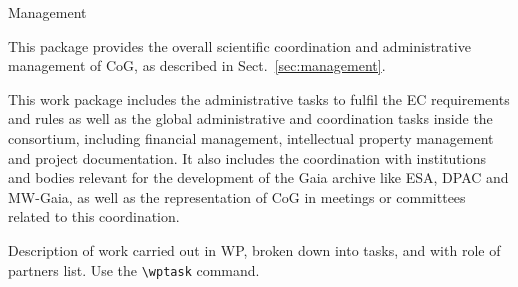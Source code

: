 
\begin{workpackage}{Management}
  \label{wp:management} %



  \makewptable %

  \begin{wpobjectives}
    This package provides the overall scientific coordination and administrative management of CoG, as described in Sect.~\ref{sec:management}.
  \end{wpobjectives}

  \begin{wpdescription}

    This work package includes the administrative tasks to fulfil the EC requirements and rules as
    well as the global administrative and coordination tasks inside the consortium, including financial
    management, intellectual property management and project documentation. It also includes the
    coordination with institutions and bodies relevant for the development of the Gaia archive like
    ESA, DPAC and MW-Gaia, as well as the representation of CoG in meetings or committees
    related to this coordination.
    
    Description of work carried out in WP, broken down into tasks, and
    with role of partners list. Use the \texttt{\textbackslash wptask} command.



\end{wpdescription}
\end{workpackage}
